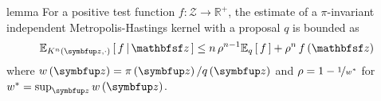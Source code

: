 \begin{theoremEnd}{lemma}\label{thm:imh_expecation}
  For a positive test function \(f : \mathcal{Z} \rightarrow \mathbb{R}^{+}\), the estimate of a \(\pi\)-invariant independent Metropolis-Hastings kernel with a proposal \(q\) is bounded as
  \begin{align*}
    \Esub{K^n\left(\vz, \cdot\right)}{ f \,\middle|\, \rvvz }
    \leq
    n \, \rho^{n-1} 
    \Esub{q}{f}
    +
    {\rho}^n \, f\left(\rvvz\right)
  \end{align*}
  where \(w\left(\vz\right) = \pi\left(\vz\right) / q\left(\vz\right)\) and \(\rho = 1 - \nicefrac{1}{w^*}\) for \(w^* = \sup_{\vz} w\left(\vz\right) \).
\end{theoremEnd}
